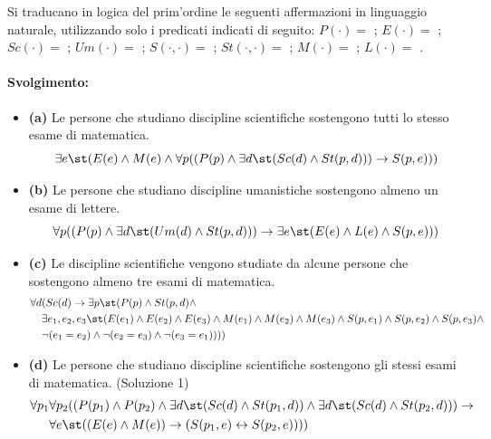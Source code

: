 Si traducano in logica del prim'ordine le seguenti affermazioni in linguaggio naturale, utilizzando solo i predicati indicati di seguito: \(P(\cdot) =\) ; \(E(\cdot) =\) ; \(Sc(\cdot) =\) ; \(Um(\cdot) =\) ; \(S(\cdot, \cdot) =\) ; \(St(\cdot, \cdot) =\) ; \(M(\cdot) =\) ; \(L(\cdot) =\) .
\paragraph{Svolgimento:}
\begin{itemize}
  \item \textbf{(a)} Le persone che studiano discipline scientifiche sostengono tutti lo stesso esame di matematica.
  \[\exists e\st (E(e) \wedge M(e) \wedge \forall p((P(p) \wedge \exists d\st (Sc(d) \wedge St(p,d))) \rightarrow S(p,e)))\]

  \item \textbf{(b)} Le persone che studiano discipline umanistiche sostengono almeno un esame di lettere.
  \[\forall p((P(p) \wedge \exists d\st (Um(d) \wedge St(p,d))) \rightarrow \exists e\st (E(e) \wedge L(e) \wedge S(p,e)))\]

  \item \textbf{(c)} Le discipline scientifiche vengono studiate da alcune persone che sostengono almeno tre esami di matematica.
  \[
  \begin{aligned}
    \forall d &(Sc(d) \rightarrow \exists p\st (P(p) \wedge St(p,d) \wedge \\
    &\exists e_1, e_2, e_3\st (E(e_1) \wedge E(e_2) \wedge E(e_3) \wedge M(e_1) \wedge M(e_2) \wedge M(e_3) \wedge S(p,e_1) \wedge S(p,e_2) \wedge S(p,e_3) \wedge \\
    &\neg(e_1=e_2) \wedge \neg(e_2=e_3) \wedge \neg(e_3=e_1))))
  \end{aligned}
  \]

  \item \textbf{(d)} Le persone che studiano discipline scientifiche sostengono gli stessi esami di matematica. (Soluzione 1)
  \[
  \begin{aligned}
    \forall p_1 &\forall p_2 ((P(p_1) \wedge P(p_2) \wedge \exists d\st (Sc(d) \wedge St(p_1,d)) \wedge \exists d\st (Sc(d) \wedge St(p_2,d))) \rightarrow \\
    &\forall e\st ((E(e) \wedge M(e)) \rightarrow (S(p_1,e) \leftrightarrow S(p_2,e))))
  \end{aligned}
  \]


\end{itemize}
